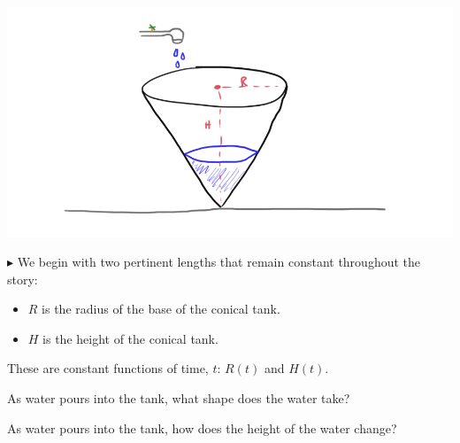 \documentclass{ximera}
\begin{document}
\begin{image}
\includegraphics{pics/cone_3.png}
\end{image}






$\blacktriangleright$ We begin with two pertinent lengths that remain constant throughout the story:

\begin{itemize}
\item $R$ is the radius of the base of the conical tank.
\item $H$ is the height of the conical tank.
\end{itemize}

These are constant functions of time, $t$: $R(t)$ and $H(t)$.







\begin{question} 


As water pours into the tank, what shape does the water take?

\begin{multipleChoice}
\end{multipleChoice}

\end{question}









\begin{question} 


As water pours into the tank, how does the height of the water change?

\begin{multipleChoice}
\end{multipleChoice}

\end{question}
\end{document}
